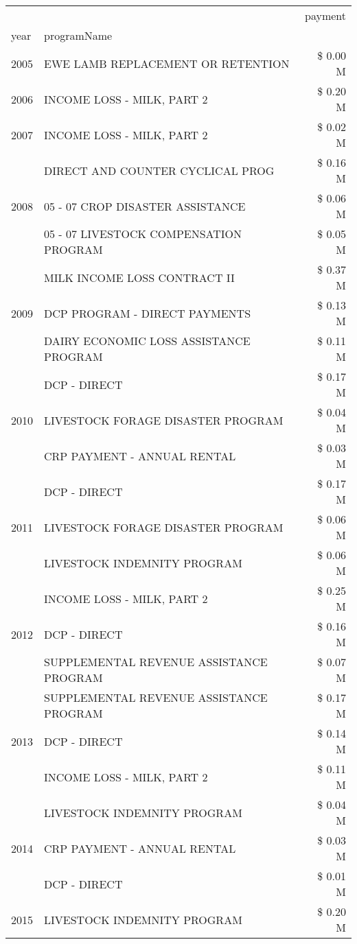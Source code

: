 \begin{tabular}{llr}
\toprule
 &  & payment \\
year & programName &  \\
\midrule
2005 & EWE LAMB REPLACEMENT OR RETENTION & \$ 0.00 M \\
\cline{1-3}
2006 & INCOME LOSS - MILK, PART 2 & \$ 0.20 M \\
\cline{1-3}
2007 & INCOME LOSS - MILK, PART 2 & \$ 0.02 M \\
\cline{1-3}
\multirow[t]{3}{*}{2008} & DIRECT AND COUNTER CYCLICAL PROG & \$ 0.16 M \\
 & 05 - 07 CROP DISASTER ASSISTANCE & \$ 0.06 M \\
 & 05 - 07 LIVESTOCK COMPENSATION PROGRAM & \$ 0.05 M \\
\cline{1-3}
\multirow[t]{3}{*}{2009} & MILK INCOME LOSS CONTRACT II & \$ 0.37 M \\
 & DCP PROGRAM - DIRECT PAYMENTS & \$ 0.13 M \\
 & DAIRY ECONOMIC LOSS ASSISTANCE PROGRAM & \$ 0.11 M \\
\cline{1-3}
\multirow[t]{3}{*}{2010} & DCP - DIRECT & \$ 0.17 M \\
 & LIVESTOCK FORAGE DISASTER PROGRAM & \$ 0.04 M \\
 & CRP PAYMENT - ANNUAL RENTAL & \$ 0.03 M \\
\cline{1-3}
\multirow[t]{3}{*}{2011} & DCP - DIRECT & \$ 0.17 M \\
 & LIVESTOCK FORAGE DISASTER PROGRAM & \$ 0.06 M \\
 & LIVESTOCK INDEMNITY PROGRAM & \$ 0.06 M \\
\cline{1-3}
\multirow[t]{3}{*}{2012} & INCOME LOSS - MILK, PART 2 & \$ 0.25 M \\
 & DCP - DIRECT & \$ 0.16 M \\
 & SUPPLEMENTAL REVENUE ASSISTANCE PROGRAM & \$ 0.07 M \\
\cline{1-3}
\multirow[t]{3}{*}{2013} & SUPPLEMENTAL REVENUE ASSISTANCE PROGRAM & \$ 0.17 M \\
 & DCP - DIRECT & \$ 0.14 M \\
 & INCOME LOSS - MILK, PART 2 & \$ 0.11 M \\
\cline{1-3}
\multirow[t]{3}{*}{2014} & LIVESTOCK INDEMNITY PROGRAM & \$ 0.04 M \\
 & CRP PAYMENT - ANNUAL RENTAL & \$ 0.03 M \\
 & DCP - DIRECT & \$ 0.01 M \\
\cline{1-3}
\multirow[t]{3}{*}{2015} & LIVESTOCK INDEMNITY PROGRAM & \$ 0.20 M \\

\end{tabular}
